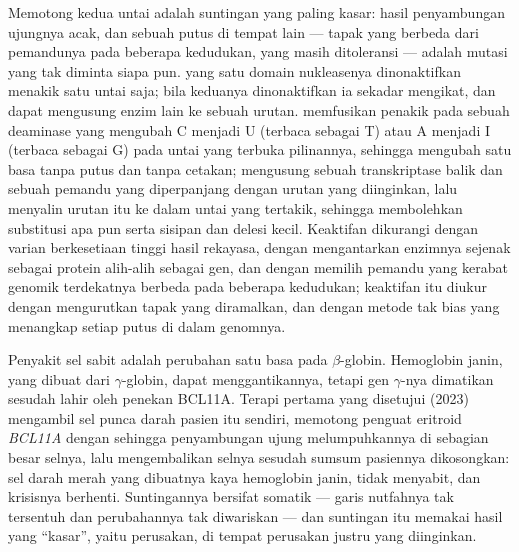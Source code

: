 \begin{proposition}\label{prop:b3:genetic-engineering:editors}
Memotong kedua untai adalah suntingan yang paling kasar: hasil penyambungan
ujungnya acak, dan sebuah putus di tempat lain --- tapak \emph{}
yang berbeda dari pemandunya pada beberapa kedudukan, yang masih ditoleransi
 --- adalah mutasi yang tak diminta siapa pun.  yang satu domain
nukleasenya dinonaktifkan menakik satu untai saja; bila keduanya dinonaktifkan
ia sekadar mengikat, dan dapat mengusung enzim lain ke sebuah urutan.
\emph{} memfusikan  penakik pada sebuah deaminase yang
mengubah C menjadi U (terbaca sebagai T) atau A menjadi I (terbaca sebagai G)
pada untai yang terbuka pilinannya, sehingga mengubah satu basa tanpa putus
dan tanpa cetakan; \emph{} mengusung sebuah transkriptase
balik dan sebuah pemandu yang diperpanjang dengan urutan yang diinginkan, lalu
menyalin urutan itu ke dalam untai yang tertakik, sehingga membolehkan
substitusi apa pun serta sisipan dan delesi kecil. Keaktifan 
dikurangi dengan varian  berkesetiaan tinggi hasil rekayasa, dengan
mengantarkan enzimnya sejenak sebagai protein alih-alih sebagai gen, dan
dengan memilih pemandu yang kerabat genomik terdekatnya berbeda pada beberapa
kedudukan; keaktifan itu diukur dengan mengurutkan tapak yang diramalkan, dan
dengan metode tak bias yang menangkap setiap putus di dalam genomnya.
\end{proposition}

\begin{example}\label{ex:b3:genetic-engineering:sickle}
Penyakit sel sabit adalah perubahan satu basa pada $\beta$-globin. Hemoglobin
janin, yang dibuat dari $\gamma$-globin, dapat menggantikannya, tetapi gen
$\gamma$-nya dimatikan sesudah lahir oleh penekan BCL11A.
Terapi  pertama yang disetujui (2023) mengambil sel punca darah pasien
itu sendiri, memotong penguat eritroid \emph{BCL11A} dengan  sehingga
penyambungan ujung melumpuhkannya di sebagian besar selnya, lalu mengembalikan
selnya sesudah sumsum pasiennya dikosongkan: sel darah merah yang dibuatnya
kaya hemoglobin janin, tidak menyabit, dan krisisnya berhenti. Suntingannya
bersifat somatik --- garis nutfahnya tak tersentuh dan perubahannya tak
diwariskan --- dan suntingan itu memakai hasil yang ``kasar'', yaitu
perusakan, di tempat perusakan justru yang diinginkan.
\end{example}

